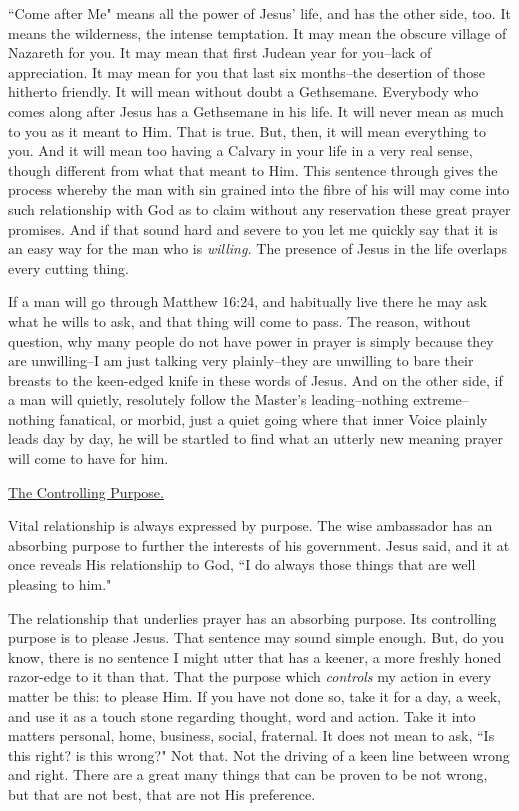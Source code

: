 ``Come after Me" means all the power of Jesus' life, and has the other
side, too. It means the wilderness, the intense temptation. It may mean
the obscure village of Nazareth for you. It may mean that first Judean
year for you--lack of appreciation. It may mean for you that last six
months--the desertion of those hitherto friendly. It will mean without
doubt a Gethsemane. Everybody who comes along after Jesus has a Gethsemane
in his life. It will never mean as much to you as it meant to Him. That is
true. But, then, it will mean everything to you. And it will mean too
having a Calvary in your life in a very real sense, though different from
what that meant to Him. This sentence through gives the process whereby
the man with sin grained into the fibre of his will may come into such
relationship with God as to claim without any reservation these great
prayer promises. And if that sound hard and severe to you let me quickly
say that it is an easy way for the man who is \textit{willing.} The presence of
Jesus in the life overlaps every cutting thing.

If a man will go through Matthew 16:24, and habitually live there he may
ask what he wills to ask, and that thing will come to pass. The reason,
without question, why many people do not have power in prayer is simply
because they are unwilling--I am just talking very plainly--they are
unwilling to bare their breasts to the keen-edged knife in these words of
Jesus. And on the other side, if a man will quietly, resolutely follow the
Master's leading--nothing extreme--nothing fanatical, or morbid, just a
quiet going where that inner Voice plainly leads day by day, he will be
startled to find what an utterly new meaning prayer will come to have for
him.



\underline{The Controlling Purpose.}


Vital relationship is always expressed by purpose. The wise ambassador has
an absorbing purpose to further the interests of his government. Jesus
said, and it at once reveals His relationship to God, ``I do always those
things that are well pleasing to him."

The relationship that underlies prayer has an absorbing purpose. Its
controlling purpose is to please Jesus. That sentence may sound simple
enough. But, do you know, there is no sentence I might utter that has a
keener, a more freshly honed razor-edge to it than that. That the purpose
which \textit{controls} my action in every matter be this: to please Him. If you
have not done so, take it for a day, a week, and use it as a touch stone
regarding thought, word and action. Take it into matters personal, home,
business, social, fraternal. It does not mean to ask, ``Is this right? is
this wrong?" Not that. Not the driving of a keen line between wrong and
right. There are a great many things that can be proven to be not wrong,
but that are not best, that are not His preference.


